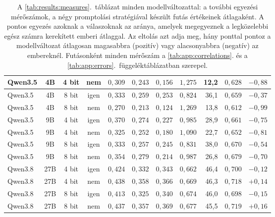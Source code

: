 \documentclass[
]{elteikthesis}[2024/04/26]
\begin{document}
\begin{table}[htbp]
{\begin{tabular}{ | l | c | c | c | r | r | r | r | r | r | r | }
		\hline
		Qwen3.5 & 4B & 4 bit & nem & $0{,}309$ & $0{,}243$ & $0{,}156$ & $1{,}275$ & 12,2 & $0{,}628$ & $-0{,}88$ \\
		\hline
		Qwen3.5 & 4B & 8 bit & igen & $0{,}333$ & $0{,}259$ & $0{,}253$ & $0{,}824$ & 36,1 & $0{,}659$ & $-0{,}37$ \\
		\hline
		Qwen3.5 & 4B & 8 bit & nem & $0{,}270$ & $0{,}213$ & $0{,}124$ & $1{,}269$ & 13,8 & $0{,}612$ & $-0{,}99$ \\
		\hline
		Qwen3.5 & 9B & 4 bit & igen & $0{,}370$ & $0{,}274$ & $0{,}227$ & $0{,}985$ & 28,9 & $0{,}661$ & $-0{,}75$ \\
		\hline
		Qwen3.5 & 9B & 4 bit & nem & $0{,}325$ & $0{,}252$ & $0{,}180$ & $1{,}090$ & 22,7 & $0{,}652$ & $-0{,}81$ \\
		\hline
		Qwen3.5 & 9B & 8 bit & igen & $0{,}333$ & $0{,}257$ & $0{,}245$ & $0{,}831$ & 38,0 & $0{,}670$ & $-0{,}54$ \\
		\hline
		Qwen3.5 & 9B & 8 bit & nem & $0{,}354$ & $0{,}279$ & $0{,}214$ & $0{,}987$ & 26,8 & $0{,}679$ & $-0{,}70$ \\
		\hline
		Qwen3.8 & 27B & 4 bit & igen & $0{,}424$ & $0{,}332$ & $0{,}343$ & $0{,}662$ & 46,4 & $0{,}700$ & $-0{,}12$ \\
		\hline
		Qwen3.8 & 27B & 4 bit & nem & $0{,}438$ & $0{,}358$ & $0{,}366$ & $0{,}669$ & 46,3 & $0{,}718$ & $+0{,}14$ \\
		\hline
		Qwen3.8 & 27B & 8 bit & igen & $0{,}413$ & $0{,}325$ & $0{,}340$ & $0{,}674$ & 46,0 & $0{,}698$ & $-0{,}15$ \\
		\hline
		Qwen3.8 & 27B & 8 bit & nem & $0{,}437$ & $0{,}357$ & $0{,}369$ & $0{,}677$ & 45,5 & $0{,}719$ & $+0{,}16$ \\
		\hline
	\end{tabular}}
	\caption[A modellváltozatok további egyezési mérőszámai (minden modellváltozat)]{A
	\ref{tab:results:measures}.~táblázat minden modellváltozattal: a további egyezési mérőszámok, a négy
	promptolási stratégiával készült futás értékeinek átlagaként.
	A pontos egyezés azoknak a válaszoknak az aránya, amelyek megegyeznek a legközelebbi egész számra
	kerekített emberi átlaggal. Az eltolás azt adja meg, hány ponttal pontoz a modellváltozat átlagosan
	magasabbra (pozitív) vagy alacsonyabbra (negatív) az embereknél.
	Futásonként minden mérőszám a \ref{tab:app:correlations}. és a \ref{tab:app:errors}.~függeléktáblázatban
	szerepel.}
	\label{tab:app:measures}
\end{table}
\end{document}
